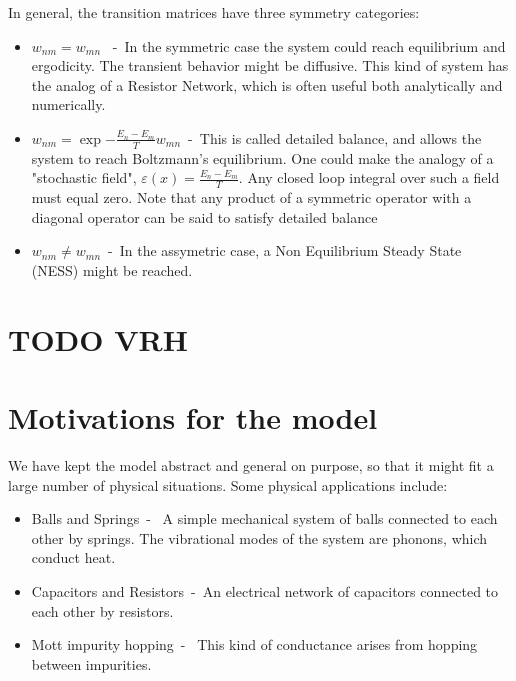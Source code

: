 In general, the transition matrices have three symmetry categories:
\begin{itemize}
  \item 
    $w_{nm} = w_{mn}$ \ -\ In the symmetric case the system could reach
      equilibrium and ergodicity. The transient behavior might be diffusive. 
      This kind of system has the analog of a Resistor Network, which is often
      useful both analytically and numerically.
  \item
    $w_{nm} = \exp{-\frac{E_n-E_m}{T}} w_{mn}$\ -\ This is called detailed balance,
      and allows the system to reach Boltzmann's equilibrium. One could make
      the analogy of a "stochastic field", $\varepsilon(x) = \frac{E_n-E_m}{T}$.
      Any closed loop integral over such a field must equal zero.
      Note that any product of a symmetric operator with a diagonal operator
      can be said to satisfy detailed balance \cite{kologromov_zur_1936}
  \item
    $w_{nm} \ne w_{mn}$\ -\ In the assymetric case, a Non Equilibrium Steady
      State (NESS) might be reached. 
\end{itemize}

\section{TODO VRH}

\section{Motivations for the model}

We have kept the model abstract and general on purpose, so that it
might fit a large number of physical situations. Some physical applications include:
%
\begin{itemize}
  \item
    Balls and Springs\ - \ A simple mechanical system of balls connected to each
      other by springs. The vibrational modes of the system are phonons, which conduct heat.
  \item
    Capacitors and Resistors\ -\ An electrical network of capacitors connected to each other
      by resistors.
  \item 
    Mott impurity hopping\ - \ This kind of conductance arises from hopping 
      between impurities.
\end{itemize}


